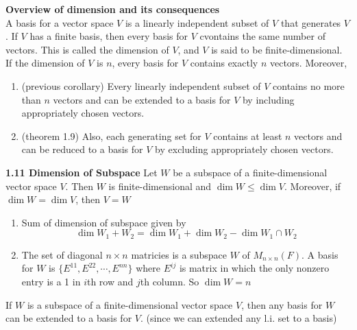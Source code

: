 \documentclass[11pt]{article}
\begin{document}
\begin{defn*}
    \textbf{Overview of dimension and its consequences} \\
    A basis for a vector space $V$ is a linearly independent subset of $V$ that generates $V$. If $V$ has a finite basis, then every basis for $V$ cvontains the same number of vectors. This is called the dimension of $V$, and $V$ is said to be finite-dimensional. If the dimension of $V$ is $n$, every basis for $V$ contains exactly $n$ vectors. Moreover, 
    \begin{enumerate}
        \item (previous corollary) Every linearly independent subset of $V$ contains no more than $n$ vectors and can be extended to a basis for $V$ by including appropriately chosen vectors.
        \item (theorem 1.9) Also, each generating set for $V$ contains at least $n$ vectors and can be reduced to a basis for $V$ by excluding appropriately chosen vectors. 
    \end{enumerate}
\end{defn*}


\begin{theorem*}
    \textbf{1.11 Dimension of Subspace} Let $W$ be a subspace of a finite-dimensional vector space $V$. Then $W$ is finite-dimensional and $\dim{W}\leq \dim{V}$. Moreover, if $\dim{W}=\dim{V}$, then $V=W$
    \begin{enumerate}
        \item Sum of dimension of subspace given by 
        \[
            \dim{W_1+W_2} = \dim{W_1}+\dim{W_2}-\dim{W_1\cap W_2}
        \]
        \item The set of diagonal $n\times n$ matricies is a subspace $W$ of $M_{n\times n}(F)$. A basis for $W$ is $\{E^{11}, E^{22}, \cdots, E^{nn}\}$ where $E^{ij}$ is matrix in which the only nonzero entry is a 1 in $i$th row and $j$th column. So $\dim{W}=n$
    \end{enumerate}
\end{theorem*}


\begin{corollary*}
    If $W$ is a subspace of a finite-dimensional vector space $V$, then any basis for $W$ can be extended to a basis for $V$. (since we can extended any l.i. set to a basis)
\end{corollary*}
\end{document}
